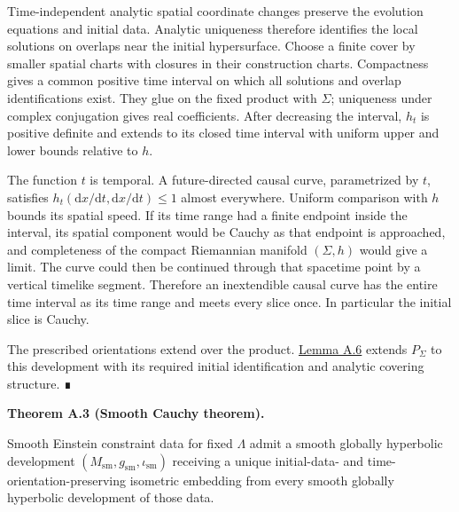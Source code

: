 \documentclass[
  english,
  11pt,
  reqno]{amsart}
\makeatletter
\newcommand{\pandocstatementheading}[1]{%
  \par\addpenalty{\@beginparpenalty}%
  \addvspace{.5\baselineskip plus .2\baselineskip minus .2\baselineskip}%
  {\normalfont\bfseries #1\par}%
  \nobreak\@afterindenttrue\@afterheading
}
\makeatother
\begin{document}
Time-independent analytic spatial coordinate changes preserve the
evolution equations and initial data. Analytic uniqueness therefore
identifies the local solutions on overlaps near the initial
hypersurface. Choose a finite cover by smaller spatial charts with
closures in their construction charts. Compactness gives a common
positive time interval on which all solutions and overlap
identifications exist. They glue on the fixed product with \(\Sigma\);
uniqueness under complex conjugation gives real coefficients. After
decreasing the interval, \(h_t\) is positive definite and extends to its
closed time interval with uniform upper and lower bounds relative to
\(h\).

The function \(t\) is temporal. A future-directed causal curve,
parametrized by \(t\), satisfies
\(h_t(\mathrm dx/\mathrm dt,\mathrm dx/\mathrm dt)\le1\) almost
everywhere. Uniform comparison with \(h\) bounds its spatial speed. If
its time range had a finite endpoint inside the interval, its spatial
component would be Cauchy as that endpoint is approached, and
completeness of the compact Riemannian manifold \((\Sigma,h)\) would
give a limit. The curve could then be continued through that spacetime
point by a vertical timelike segment. Therefore an inextendible causal
curve has the entire time interval as its time range and meets every
slice once. In particular the initial slice is Cauchy.

The prescribed orientations extend over the product.
\hyperref[lem:relative-spin-extension-v2]{Lemma A.6} extends
\(P_\Sigma\) to this development with its required initial
identification and analytic covering structure. ∎

\pandocstatementheading{\protect{}\label{thm:smooth-mghd-input}Theorem A.3 (Smooth Cauchy theorem).}

Smooth Einstein constraint data for fixed \(\Lambda\) admit a smooth
globally hyperbolic development
\((M_{\mathrm{sm}},g_{\mathrm{sm}},\iota_{\mathrm{sm}})\) receiving a
unique initial-data- and time-orientation-preserving isometric embedding
from every smooth globally hyperbolic development of those data.
\end{document}
